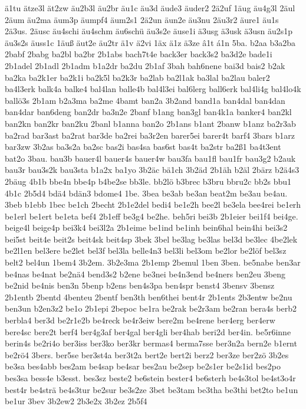 {ä1tu
ätze3l
ät2zw
äu2b3l
äu2br
äu1c
äu3d
äude3
äuder2
2ä2uf
1äug
äu4g3l
2äul
2äum
äu2ma
äum3p
äumpf4
äum2s1
2ä2un
äun2e
äu3nu
2äu3r2
äure1
äu1s
2ä3us.
2äusc
äu4schi
äu4schm
äu6schü
äu3s2e
äuse1i
ä3usg
ä3usk
ä3usn
äu2s1p
äu3s2s
äuss1c
1äuß
äut2e
äu2tr
ä1v
ä2vi
1äx
ä1z
ä3ze
â1t
á1n
5ba.
b2aa
b3a2ba
2babf
2babg
ba2bl
ba2br
2b1abs
bach7t4e
back3er
back3s2
ba3d2e
bade1i
2b1adel
2b1adl
2b1adm
b1a2dr
ba2du
2b1af
3bah
bah6nene
bai3d
bais2
b2ak
ba2ka
ba2k1er
ba2k1i
ba2k5l
ba2k3r
ba2lab
ba2l1ak
ba3lal
ba2lau
baler2
ba4l3erk
balk4a
balke4
bal4lan
balle4b
bal4l3ei
bal6lerg
ball6erk
bal4li4g
bal4lo4k
ballö3s
2b1am
b2a3ma
ba2me
4bamt
ban2a
3b2and
band1a
ban4dal
ban4dan
ban4dar
ban6deng
ban2dr
ba3n2e
2banf
b1ang
ban3gl
ban4k1a
banker4
ban2kl
ban2kn
ban2kr
ban2ku
2banl
b1anna
ban2o
2b1ans
b1ant
2banw
b1anz
ba2r3ab
ba2rad
bar3ast
ba2rat
bar3de
ba2rei
ba3r2en
barer5ei
barer4t
barf4
3bars
b1arz
bar3zw
3b2as
ba3s2a
ba2sc
bas2i
bas4sa
bas6st
bas4t
ba2str
ba2ß1
ba4t3ent
bat2o
3bau.
bau3b
bauer4l
bauer4s
bauer4w
bau3fa
bau1fl
bau1fr
bau3g2
b2auk
bau3r
bau3s2k
bau3sta
b1a2x
ba1yo
3b2äc
bä1ch
3b2äd
2b1äh
b2äl
2bärz
b2ä4s3
2bäug
4b1b
bbe4n
bbe4p
b4be2se
bb3le.
bb2lö
b3brec
b3bru
bbru2c
bb2s
bbu1
4b1c
2b5d4
bdä4
bdän3
bdome4
1be.
3bea
be3ab
be3an
beat2m
be3au
be4au.
3beb
b1ebb
1bec
be1ch
2becht
2b1e2del
bedi4
be1e2h
bee2l
be3ela
bee4rei
be1erh
be1erl
be1ert
be1eta
bef4
2b1eff
be3g4
be2he.
beh5ri
bei3b
2b1eier
bei1f4
bei4ge.
beige4l
beige4p
bei3k4
bei3l2a
2b1eime
be1ind
be1inh
bein6hal
bein4hi
bei3s2
bei5st
beit4e
beit2s
beit4sk
beit4sp
3bek
3bel
be3lag
be3las
bel3d
be3lec
4be2lek
be2l1en
bel3ere
be2let
bel3f
bel3la
belle4n3
bel3li
bel3om
be2lor
be2löf
bel3sz
belt2
bel4un
1bem4
3b2em.
3b2e3ma
2b1emp
2bemul
1ben
3ben.
be5nabe
ben3ar
be4nas
be4nat
be2nä4
bend3s2
b2ene
be3nei
be4n3end
be4ners
ben2eu
3beng
be2nid
be4nis
ben3n
5benp
b2ens
ben4s3pa
ben4spr
benst4
3bensv
3bensz
2b1entb
2bentd
4benteu
2bentf
ben3th
ben6thei
bent4r
2b1ents
2b3entw
be2nu
ben3un
b2en3z2
be1o
2b1epi
2bepoc
be1ra
be2rak
be2r3am
be2ran
bera4s
berb2
berbla4
ber3d
be2r1e2b
be4reck
be4r3eiw
bere2m
be4rene
ber4erg
ber4erw
bere4sc
bere2t
berf4
ber4g3af
ber4gal
ber4gli
ber4hab
beri2d
ber4in.
be5r6inne
berin4s
be2ri4o
ber3iss
ber3ko
ber3kr
bermas4
berma7sse
ber3n2a
bern2e
b1ernt
be2rö4
3bers.
ber5se
ber3st4a
ber3t2a
bert2e
bert2i
berz2
ber3ze
ber2zö
3b2es
be3sa
bes4abb
bes2am
be4sap
be4sar
bes2au
be2sep
be2s1er
be2s1id
bes2po
bes3sa
bess4e
b3esst.
bes3sz
beste2
be6stein
bester4
be6sterh
be4s3tol
be4st3o4r
best4r
be4strä
be4s3tur
be2sur
be3s2ze
3bet
be3tam
be3tha
be3thi
bet2to
be1un
be1ur
3bev
3b2ew2
2b3e2x
3b2ez
2b5f4
}
